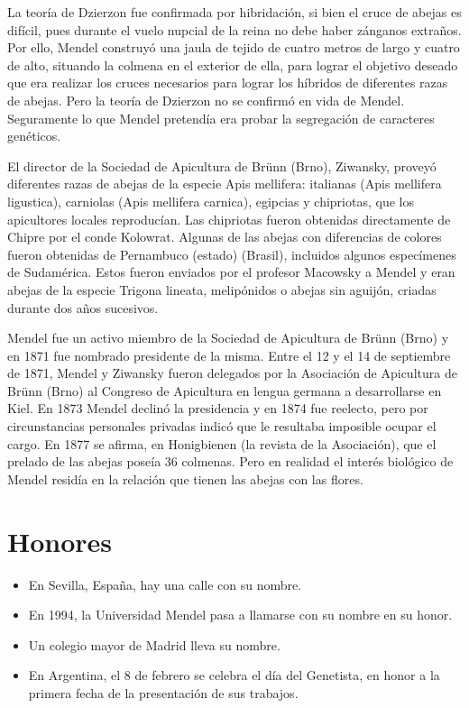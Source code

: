 \documentclass{report}
\begin{document}
La teoría de Dzierzon fue confirmada por hibridación, si bien el cruce de abejas es difícil, pues durante el vuelo nupcial de la reina no debe haber zánganos extraños. Por ello, Mendel construyó una jaula de tejido de cuatro metros de largo y cuatro de alto, situando la colmena en el exterior de ella, para lograr el objetivo deseado que era realizar los cruces necesarios para lograr los híbridos de diferentes razas de abejas. Pero la teoría de Dzierzon no se confirmó en vida de Mendel. Seguramente lo que Mendel pretendía era probar la segregación de caracteres genéticos.

El director de la Sociedad de Apicultura de Brünn (Brno), Ziwansky, proveyó diferentes razas de abejas de la especie Apis mellifera: italianas (Apis mellifera ligustica), carniolas (Apis mellifera carnica), egipcias y chipriotas, que los apicultores locales reproducían. Las chipriotas fueron obtenidas directamente de Chipre por el conde Kolowrat. Algunas de las abejas con diferencias de colores fueron obtenidas de Pernambuco (estado) (Brasil), incluidos algunos especímenes de Sudamérica. Estos fueron enviados por el profesor Macowsky a Mendel y eran abejas de la especie Trigona lineata, melipónidos o abejas sin aguijón, criadas durante dos años sucesivos.

Mendel fue un activo miembro de la Sociedad de Apicultura de Brünn (Brno) y en 1871 fue nombrado presidente de la misma. Entre el 12 y el 14 de septiembre de 1871, Mendel y Ziwansky fueron delegados por la Asociación de Apicultura de Brünn (Brno) al Congreso de Apicultura en lengua germana a desarrollarse en Kiel. En 1873 Mendel declinó la presidencia y en 1874 fue reelecto, pero por circunstancias personales privadas indicó que le resultaba imposible ocupar el cargo. En 1877 se afirma, en Honigbienen (la revista de la Asociación), que el prelado de las abejas poseía 36 colmenas. Pero en realidad el interés biológico de Mendel residía en la relación que tienen las abejas con las flores.

\chapter{Honores}

\begin{itemize}
	\item En Sevilla, España, hay una calle con su nombre.
	\item En 1994, la Universidad Mendel pasa a llamarse con su nombre en su honor.
	\item Un colegio mayor de Madrid lleva su nombre.
	\item En Argentina, el 8 de febrero se celebra el día del Genetista, en honor a la primera fecha de la presentación de sus trabajos.
\end{itemize}
\end{document}
